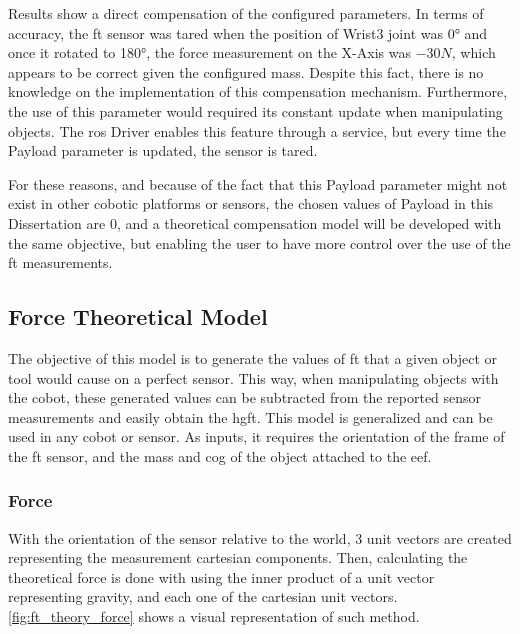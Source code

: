 \par Results show a direct compensation of the configured parameters. In terms of accuracy, the \ac{ft} sensor was tared when the position of Wrist3 joint was \ang{0} and once it rotated to \ang{180}, the force measurement on the X-Axis was $-30\si{N}$, which appears to be correct given the configured mass. Despite this fact, there is no knowledge on the implementation of this compensation mechanism. Furthermore, the use of this parameter would required its constant update when manipulating objects. The \ac{ros} Driver enables this feature through a service, but every time the Payload parameter is updated, the sensor is tared. 

\par For these reasons, and because of the fact that this Payload parameter might not exist in other cobotic platforms or sensors, the chosen values of Payload in this Dissertation are 0, and a theoretical compensation model will be developed with the same objective, but enabling the user to have more control over the use of the \ac{ft} measurements.



\subsection{Force Theoretical Model}
\label{ssec:ft_model}

\par The objective of this model is to generate the values of \ac{ft} that a given object or tool would cause on a perfect sensor. This way, when manipulating objects with the cobot, these generated values can be subtracted from the reported sensor measurements and easily obtain the \ac{hgft}. This model is generalized and can be used in any cobot or sensor. As inputs, it requires the orientation of the frame of the \ac{ft} sensor, and the mass and \ac{cog} of the object attached to the \ac{eef}.

\subsubsection{Force}

\par With the orientation of the sensor relative to the world, 3 unit vectors are created representing the measurement cartesian components. Then, calculating the theoretical force is done with using the inner product of a unit vector representing gravity, and each one of the cartesian unit vectors. \autoref{fig:ft_theory_force} shows a visual representation of such method.


